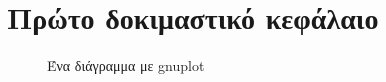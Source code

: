 \section{Πρώτο δοκιμαστικό κεφάλαιο}
\lipsum
\cite{bowenspaper}
\begin{figure}[tbp]
    \centering
    
    \caption{Ένα διάγραμμα με gnuplot}
\end{figure}
